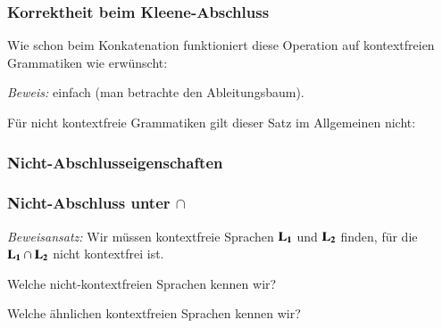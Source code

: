 \documentclass[aspectratio=1610,onlymath]{beamer}
\begin{document}
\begin{frame}\frametitle{Korrektheit beim Kleene-Abschluss}

Wie schon beim Konkatenation funktioniert diese Operation auf kontextfreien Grammatiken wie
erwünscht:


\emph{Beweis:} einfach (man betrachte den Ableitungsbaum).
\medskip\pause

Für nicht kontextfreie Grammatiken gilt dieser Satz im Allgemeinen nicht:


\end{frame}

\begin{frame}\frametitle{Nicht-Abschlusseigenschaften}


\end{frame}

\begin{frame}\frametitle{Nicht-Abschluss unter $\cap$}

\emph{Beweisansatz:} Wir müssen kontextfreie Sprachen $\textbf{\textcolor{black}{L}}_{\textbf{\textcolor{black}{1}}}$ und $\textbf{\textcolor{black}{L}}_{\textbf{\textcolor{black}{2}}}$ finden, für die
$\textbf{\textcolor{black}{L}}_{\textbf{\textcolor{black}{1}}}\cap\textbf{\textcolor{black}{L}}_{\textbf{\textcolor{black}{2}}}$ nicht kontextfrei ist.\medskip

\alert{Welche nicht-kontextfreien Sprachen kennen wir?}\pause
\medskip

\bigskip\pause

\alert{Welche ähnlichen kontextfreien Sprachen kennen wir?}\pause
\medskip


\end{frame}
\end{document}
